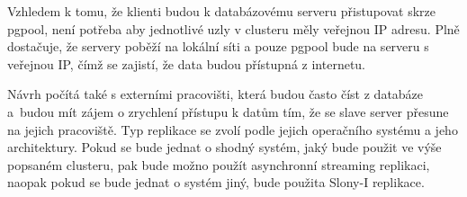 Vzhledem k tomu, že klienti budou k databázovému serveru přistupovat skrze pgpool, není potřeba aby jednotlivé uzly v clusteru měly veřejnou IP adresu. Plně dostačuje, že servery poběží na lokální síti a pouze pgpool bude na serveru s veřejnou IP, čímž se zajistí, že data budou přístupná z internetu. 

Návrh počítá také s externími pracovišti, která budou často číst z databáze a~budou mít zájem o zrychlení přístupu k datům tím, že se slave server přesune na jejich pracoviště. Typ replikace se zvolí podle jejich operačního systému a jeho architektury. Pokud se bude jednat o shodný systém, jaký bude použit ve výše popsaném clusteru, pak bude možno použít asynchronní streaming replikaci, naopak pokud se bude jednat o systém jiný, bude použita Slony-I replikace. 

